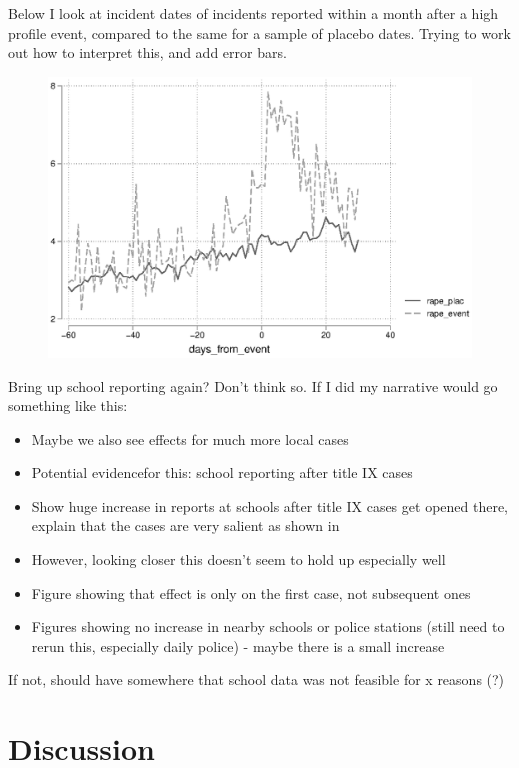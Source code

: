 \documentclass[AER,draftmode]{AEA}
\begin{document}
Below I look at incident dates of incidents reported within a month after a high profile event, compared to the same for a sample of placebo dates. Trying to work out how to interpret this, and add error bars. 

\begin{figure}
\includegraphics[width=\linewidth]{figures/idt_analysis_2.eps}
\end{figure}


Bring up school reporting again? Don't think so. If I did my narrative would go something like this:
\begin{itemize}
    \item Maybe we also see effects for much more local cases
    \item Potential evidencefor this: school reporting after title IX cases
    \item Show huge increase in reports at schools after title IX cases get opened there, explain that the cases are very salient as shown in 
    \item However, looking closer this doesn't seem to hold up especially well
    \item Figure showing that effect is only on the first case, not subsequent ones
    \item Figures showing no increase in nearby schools or police stations (still need to rerun this, especially daily police) - maybe there is a small increase
\end{itemize}
If not, should have somewhere that school data was not feasible for x reasons (?)
\section{Discussion}
\end{document}
